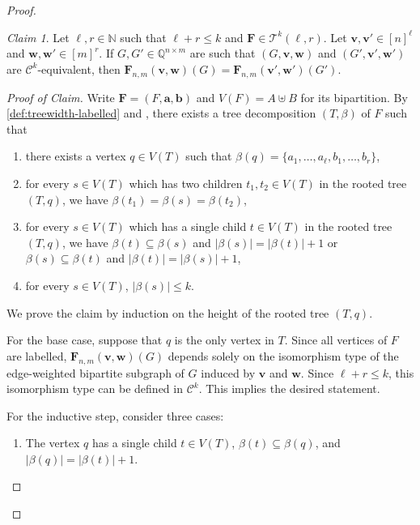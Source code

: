 \documentclass[11pt, DIV=15]{scrarticle}
\theoremstyle{definition}
\theoremstyle{plain}
\theoremstyle{remark}
\newtheorem{claim}{Claim}[definition]
\newenvironment{claimproof}[1][Proof of Claim]{\begin{proof}[#1] \renewcommand{\qedsymbol}{$\lrcorner$}}{ \end{proof}}
\begin{document}
\begin{proof}
		\begin{claim}
			Let $\ell, r \in \mathbb{N}$ such that $\ell +r \leq k$ and $\boldsymbol{F} \in \mathcal{T}^k(\ell, r)$.
			Let $\boldsymbol{v},\boldsymbol{v}' \in [n]^\ell$ and $\boldsymbol{w},\boldsymbol{w}' \in [m]^r$. 
			If $G, G' \in \mathbb{Q}^{n\times m}$ are such that $(G, \boldsymbol{v}, \boldsymbol{w})$ and $(G', \boldsymbol{v}', \boldsymbol{w}')$ are $\mathcal{C}^k$-equivalent,
			then $\boldsymbol{F}_{n,m}(\boldsymbol{v}, \boldsymbol{w})(G) = \boldsymbol{F}_{n,m}(\boldsymbol{v}', \boldsymbol{w}')(G')$.
		\end{claim}
		\begin{claimproof}
			Write $\boldsymbol{F} = (F, \boldsymbol{a}, \boldsymbol{b})$ and $V(F) = A \uplus B$ for its bipartition.
			By \cref{def:treewidth-labelled} and \cite[Lemma~7]{bodlaender_partial_1998},
			there exists a tree decomposition $(T, \beta)$ of $F$ such that
			\begin{enumerate}
				\item there exists a vertex $q \in V(T)$ such that $\beta(q)= \{a_1, \dots, a_\ell, b_1, \dots, b_r \}$,
				\item for every $s \in V(T)$ which has
                                  two children $t_1, t_2 \in V(T)$ in
                                  the rooted tree $(T, q)$, we have $\beta(t_1) = \beta(s) = \beta(t_2)$,
				\item for every $s \in V(T)$ which has
                                  a single child $t \in V(T)$ in the
                                  rooted tree $(T, q)$, we have $\beta(t) \subseteq \beta(s)$ and $|\beta(s)| = |\beta(t)|+1$ or  $\beta(s) \subseteq \beta(t)$ and $|\beta(t)| = |\beta(s)|+1$,
				\item for every $s \in V(T)$, $|\beta(s)| \leq k$.
			\end{enumerate}
			We prove the claim by induction on the height of the rooted tree $(T, q)$.
			
			For the base case, suppose that $q$ is the only vertex in $T$.
			Since all vertices of $F$ are labelled, 
			$\boldsymbol{F}_{n,m}(\boldsymbol{v}, \boldsymbol{w})(G)$ depends solely on the isomorphism type of the edge-weighted bipartite subgraph of $G$ induced by $\boldsymbol{v}$ and $\boldsymbol{w}$.
			Since $\ell + r \leq k$, this isomorphism type can be defined in $\mathcal{C}^k$.
			This implies the desired statement.
			
			For the inductive step, consider three cases:
			\begin{enumerate}
				\item The vertex $q$ has a single child $t \in V(T)$, $\beta(t) \subseteq \beta(q)$, and $|\beta(q)| = |\beta(t)|+1$.
				

\end{enumerate}
\end{claimproof}
\end{proof}
\end{document}
